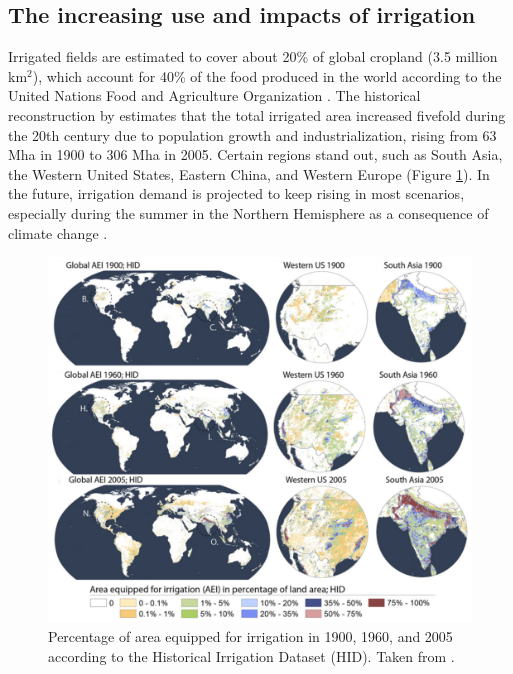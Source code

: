 \subsection{The increasing use and impacts of irrigation}

Irrigated fields are estimated to cover about 20\% of global cropland (3.5 million km$^2$), which account for 40\% of the food produced in the world according to the United Nations Food and Agriculture Organization \citep{UNESCO2019,mcdermid_irrigation_2023}.
The historical reconstruction by \citet{siebert_global_2015} estimates that the total irrigated area increased fivefold during the 20th century due to population growth and industrialization, rising from 63 Mha in 1900 to 306 Mha in 2005. Certain regions stand out, such as South Asia, the Western United States, Eastern China, and Western Europe (Figure \ref{irrig_evolution_map}).
In the future, irrigation demand is projected to keep rising in most scenarios, especially during the summer in the Northern Hemisphere as a consequence of climate change \citep{wada_multimodel_2013}.

\begin{figure}[ht]
    \centering
    \includegraphics[width=\textwidth]{images/intro/irrig_evolution_Siebert.png}
    \caption{Percentage of area equipped for irrigation in 1900, 1960, and 2005 according to the Historical Irrigation Dataset (HID). Taken from \citet{siebert_global_2015}.}
    \label{irrig_evolution_map}
\end{figure}

